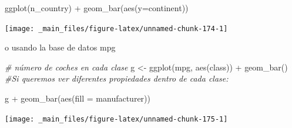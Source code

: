 \documentclass[
]{book}
\newenvironment{Shaded}{\begin{snugshade}}{\end{snugshade}}
\newcommand{\AttributeTok}[1]{\textcolor[rgb]{0.77,0.63,0.00}{#1}}
\newcommand{\CommentTok}[1]{\textcolor[rgb]{0.56,0.35,0.01}{\textit{#1}}}
\newcommand{\FunctionTok}[1]{\textcolor[rgb]{0.00,0.00,0.00}{#1}}
\newcommand{\NormalTok}[1]{#1}
\newcommand{\OtherTok}[1]{\textcolor[rgb]{0.56,0.35,0.01}{#1}}
\newcommand{\SpecialCharTok}[1]{\textcolor[rgb]{0.00,0.00,0.00}{#1}}
\begin{document}
\begin{Shaded}
\begin{Highlighting}[]
\FunctionTok{ggplot}\NormalTok{(n\_country) }\SpecialCharTok{+} \FunctionTok{geom\_bar}\NormalTok{(}\FunctionTok{aes}\NormalTok{(}\AttributeTok{y=}\NormalTok{continent))}
\end{Highlighting}
\end{Shaded}

\begin{center}\texttt{[image: \_main\_files/figure-latex/unnamed-chunk-174-1]} \end{center}

o usando la base de datos mpg

\begin{Shaded}
\begin{Highlighting}[]

\CommentTok{\# número de coches en cada clase}
\NormalTok{g }\OtherTok{\textless{}{-}} \FunctionTok{ggplot}\NormalTok{(mpg, }\FunctionTok{aes}\NormalTok{(class)) }\SpecialCharTok{+} \FunctionTok{geom\_bar}\NormalTok{()}
\CommentTok{\#Si queremos ver diferentes propiedades dentro de cada clase:}

\NormalTok{g }\SpecialCharTok{+} \FunctionTok{geom\_bar}\NormalTok{(}\FunctionTok{aes}\NormalTok{(}\AttributeTok{fill =}\NormalTok{ manufacturer))}
\end{Highlighting}
\end{Shaded}

\begin{center}\texttt{[image: \_main\_files/figure-latex/unnamed-chunk-175-1]} \end{center}

  
\end{document}
